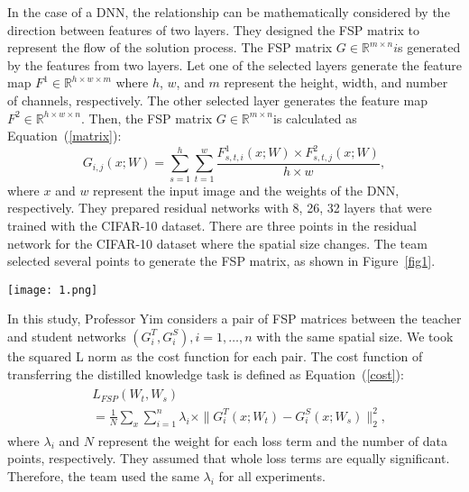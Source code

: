 \documentclass[twocolumn]{article}
\begin{document}
    In the case of a DNN, the relationship can be mathematically considered by the direction between features of two layers. They designed the FSP matrix to represent the flow of the solution process. The FSP matrix $G\in \mathbb{R}^{m×n} i$s generated by the features from two layers. Let one of the selected layers generate the feature map $F^1\in \mathbb{R}^{h\times w\times m}$ where $h$, $w$, and $m$ represent the height, width, and number of channels, respectively. The other selected layer generates the feature map $F^2\in \mathbb{R}^{h\times w\times n}$. Then, the FSP matrix $G\in \mathbb{R}^{m\times n}$is calculated as Equation~(\ref{matrix}):
    \begin{equation}
    G_{i,j}(x;W)=\sum_{s=1}^{h} \sum_{t=1}^{w} \frac{F_{s,t,i}^1(x;W)\times F_{s,t,j}^2(x;W)}{h\times w},    \label{matrix}
    \end{equation}
    where $x$ and $w$ represent the input image and the weights of the DNN, respectively. They prepared residual networks with 8, 26, 32 layers that were trained with the CIFAR-10 dataset. There are three points in the residual network for the CIFAR-10 dataset where the spatial size changes. The team selected several points to generate the FSP matrix, as shown in Figure~\ref{fig1}.	
	 \begin{figure*}[htbp] 
		\begin{center} 
			\texttt{[image: 1.png]} 
			\caption{Complete architecture of their proposed method. The numbers of layers of the teacher and student networks can be changed. The FSP matrices are extracted at the three sections that maintain the same spatial size. There are two stages of their proposed method. In stage 1, the student network is trained to minimize the distance between the FSP matrices of the student and teacher networks. Then, the pretrained weights of the student DNN are used for the initial weight in stage 2. Stage 2 represents the normal training procedure.}\label{fig1}  
		\end{center}   
	\end{figure*}
	
	In this study, Professor Yim considers a pair of FSP matrices between the teacher and student networks $(G_i^T ,G_i^S ), i = 1 ,\dots,n $ with the same spatial size. We took the squared L norm as the cost function for each pair. The cost function of transferring the distilled knowledge task is defined as Equation~(\ref{cost}):
    \begin{equation}
    \begin{aligned}
    \begin{split}
    &L_{FSP}(W_t,W_s)\\
    &= \frac{1}{N}\sum_{x} \sum_{i=1}^{n} \lambda_i \times \parallel  G_{i}^T(x;W_t)-G_{i}^S(x;W_s)\parallel_2^2,  \label{cost}
    \end{split}
    \end{aligned}
    \end{equation}
   where $\lambda_i$ and $N$ represent the weight for each loss term and the number of data points, respectively. They assumed that whole loss terms are equally significant. Therefore, the team used the same $\lambda_i$ for all experiments.
   
\end{document}
